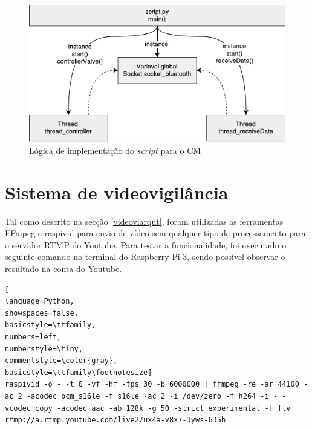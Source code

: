 \begin{figure}[h]
	\centering
	\includegraphics[width=0.67\linewidth]{esquemas/threads-python-script.pdf}
	\caption{Lógica de implementação do \textit{script} para o \acl{CM} }
	\label{threadscript}
\end{figure}









\section{Sistema de videovigilância}


Tal como descrito na secção \ref{videoviarqut}, foram utilizadas as ferramentas FFmpeg e raspivid para envio de vídeo sem qualquer tipo de processamento para o servidor \ac{RTMP} do Youtube. Para testar a funcionalidade, foi executado o seguinte comando no terminal do Raspberry Pi 3, sendo possível observar o resultado na conta do Youtube.


\begin{lstlisting}[
language=Python,
showspaces=false,
basicstyle=\ttfamily,
numbers=left,
numberstyle=\tiny,
commentstyle=\color{gray},
basicstyle=\ttfamily\footnotesize]
raspivid -o - -t 0 -vf -hf -fps 30 -b 6000000 | ffmpeg -re -ar 44100 -ac 2 -acodec pcm_s16le -f s16le -ac 2 -i /dev/zero -f h264 -i - -vcodec copy -acodec aac -ab 128k -g 50 -strict experimental -f flv rtmp://a.rtmp.youtube.com/live2/ux4a-v8x7-3yws-635b

\end{lstlisting}


